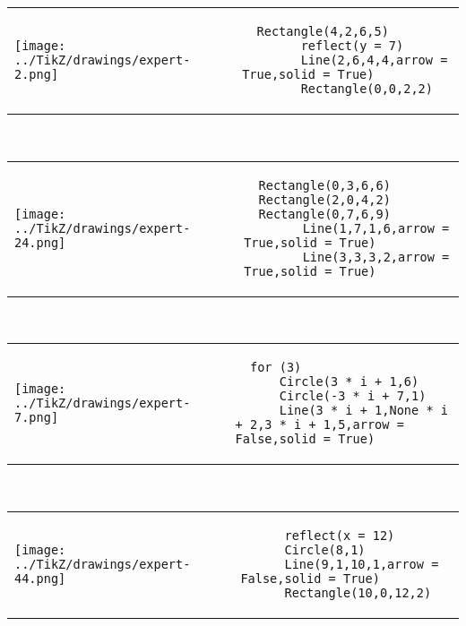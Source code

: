         \begin{tabular}{ll}
\texttt{[image: ../TikZ/drawings/expert-2.png]}&
        \begin{minipage}{10cm}
        \begin{verbatim}
  Rectangle(4,2,6,5)
        reflect(y = 7)
        Line(2,6,4,4,arrow = True,solid = True)
        Rectangle(0,0,2,2)
        \end{verbatim}
\end{minipage}
\end{tabular}        
        \\

        \begin{tabular}{ll}
\texttt{[image: ../TikZ/drawings/expert-24.png]}&
        \begin{minipage}{10cm}
        \begin{verbatim}
  Rectangle(0,3,6,6)
  Rectangle(2,0,4,2)
  Rectangle(0,7,6,9)
        Line(1,7,1,6,arrow = True,solid = True)
        Line(3,3,3,2,arrow = True,solid = True)
        \end{verbatim}
\end{minipage}
\end{tabular}        
        \\

        \begin{tabular}{ll}
\texttt{[image: ../TikZ/drawings/expert-7.png]}&
        \begin{minipage}{10cm}
        \begin{verbatim}
  for (3)
      Circle(3 * i + 1,6)
      Circle(-3 * i + 7,1)
      Line(3 * i + 1,None * i + 2,3 * i + 1,5,arrow = False,solid = True)
        \end{verbatim}
\end{minipage}
\end{tabular}        
        \\

        \begin{tabular}{ll}
\texttt{[image: ../TikZ/drawings/expert-44.png]}&
        \begin{minipage}{10cm}
        \begin{verbatim}
      reflect(x = 12)
      Circle(8,1)
      Line(9,1,10,1,arrow = False,solid = True)
      Rectangle(10,0,12,2)
        \end{verbatim}
\end{minipage}
\end{tabular}        
        \\


